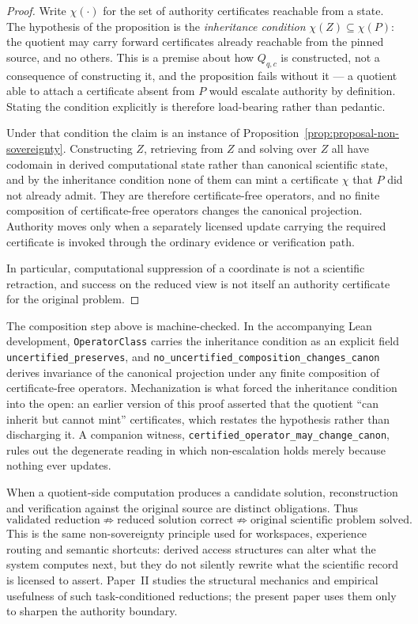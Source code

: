 \begin{proof}
Write $\chi(\cdot)$ for the set of authority certificates reachable from a state. The hypothesis of the proposition is the \emph{inheritance condition} $\chi(Z)\subseteq\chi(P)$: the quotient may carry forward certificates already reachable from the pinned source, and no others. This is a premise about how $Q_{q,c}$ is constructed, not a consequence of constructing it, and the proposition fails without it --- a quotient able to attach a certificate absent from $P$ would escalate authority by definition. Stating the condition explicitly is therefore load-bearing rather than pedantic.

Under that condition the claim is an instance of Proposition~\ref{prop:proposal-non-sovereignty}. Constructing $Z$, retrieving from $Z$ and solving over $Z$ all have codomain in derived computational state rather than canonical scientific state, and by the inheritance condition none of them can mint a certificate $\chi$ that $P$ did not already admit. They are therefore certificate-free operators, and no finite composition of certificate-free operators changes the canonical projection. Authority moves only when a separately licensed update carrying the required certificate is invoked through the ordinary evidence or verification path.

In particular, computational suppression of a coordinate is not a scientific retraction, and success on the reduced view is not itself an authority certificate for the original problem.
\end{proof}

\begin{remark}
The composition step above is machine-checked. In the accompanying Lean development, \texttt{OperatorClass} carries the inheritance condition as an explicit field \texttt{uncertified\_preserves}, and \texttt{no\_uncertified\_composition\_changes\_canon} derives invariance of the canonical projection under any finite composition of certificate-free operators. Mechanization is what forced the inheritance condition into the open: an earlier version of this proof asserted that the quotient ``can inherit but cannot mint'' certificates, which restates the hypothesis rather than discharging it. A companion witness, \texttt{certified\_operator\_may\_change\_canon}, rules out the degenerate reading in which non-escalation holds merely because nothing ever updates.
\end{remark}

When a quotient-side computation produces a candidate solution, reconstruction and verification against the original source are distinct obligations. Thus
\[
\text{validated reduction}
\not\Rightarrow
\text{reduced solution correct}
\not\Rightarrow
\text{original scientific problem solved}.
\]
This is the same non-sovereignty principle used for workspaces, experience routing and semantic shortcuts: derived access structures can alter what the system computes next, but they do not silently rewrite what the scientific record is licensed to assert. Paper~II studies the structural mechanics and empirical usefulness of such task-conditioned reductions; the present paper uses them only to sharpen the authority boundary.
